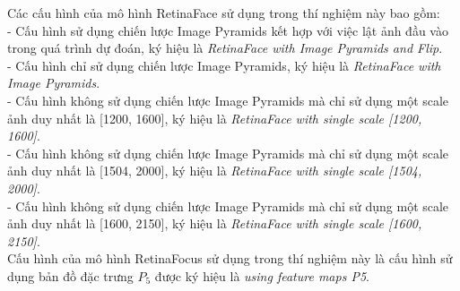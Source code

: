 {    Các cấu hình của mô hình RetinaFace sử dụng trong thí nghiệm này bao gồm: \\
    - Cấu hình sử dụng chiến lược Image Pyramids kết hợp với việc lật ảnh đầu vào trong quá trình dự đoán, ký hiệu là \textit{RetinaFace with Image Pyramids and Flip}. \\
    - Cấu hình chỉ sử dụng chiến lược Image Pyramids, ký hiệu là \textit{RetinaFace with Image Pyramids}. \\
    - Cấu hình không sử dụng chiến lược Image Pyramids mà chỉ sử dụng một scale ảnh duy nhất là [1200, 1600], ký hiệu là \textit{RetinaFace with single scale [1200, 1600]}. \\
    - Cấu hình không sử dụng chiến lược Image Pyramids mà chỉ sử dụng một scale ảnh duy nhất là [1504, 2000], ký hiệu là \textit{RetinaFace with single scale [1504, 2000]}. \\
    - Cấu hình không sử dụng chiến lược Image Pyramids mà chỉ sử dụng một scale ảnh duy nhất là [1600, 2150], ký hiệu là \textit{RetinaFace with single scale [1600, 2150]}. \\
    Cấu hình của mô hình RetinaFocus sử dụng trong thí nghiệm này là cấu hình sử dụng bản đồ đặc trưng $P_5$ được ký hiệu là \textit{using feature maps P5}.

}
